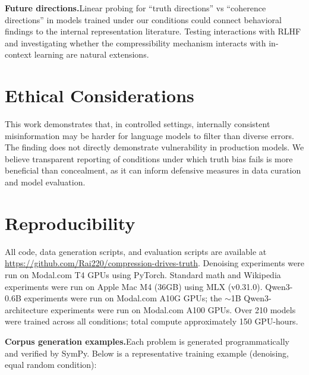 \documentclass{article}
\begin{document}
\textbf{Future directions.}\quad Linear probing for ``truth directions'' vs ``coherence directions'' in models trained under our conditions could connect behavioral findings to the internal representation literature. Testing interactions with RLHF and investigating whether the compressibility mechanism interacts with in-context learning are natural extensions.

\section*{Ethical Considerations}

This work demonstrates that, in controlled settings, internally consistent misinformation may be harder for language models to filter than diverse errors. The finding does not directly demonstrate vulnerability in production models. We believe transparent reporting of conditions under which truth bias fails is more beneficial than concealment, as it can inform defensive measures in data curation and model evaluation.




\appendix

\section{Reproducibility}
\label{app:reproducibility}

All code, data generation scripts, and evaluation scripts are available at \url{https://github.com/Rai220/compression-drives-truth}. Denoising experiments were run on Modal.com T4 GPUs using PyTorch. Standard math and Wikipedia experiments were run on Apple Mac M4 (36GB) using MLX (v0.31.0). Qwen3-0.6B experiments were run on Modal.com A10G GPUs; the ${\sim}$1B Qwen3-architecture experiments were run on Modal.com A100 GPUs. Over 210 models were trained across all conditions; total compute approximately 150 GPU-hours.

\textbf{Corpus generation examples.}\quad Each problem is generated programmatically and verified by SymPy. Below is a representative training example (denoising, equal random condition):
\end{document}
